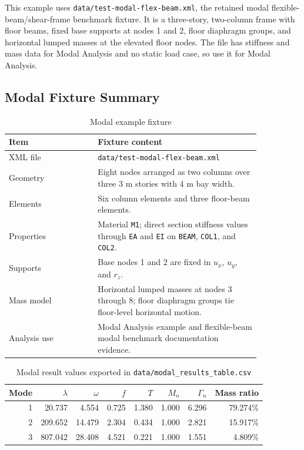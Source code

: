 \documentclass[11pt,a4paper]{article}
\begin{document}
This example uses \texttt{data/test-modal-flex-beam.xml}, the retained modal flexible-beam/shear-frame benchmark fixture. It is a three-story, two-column frame with floor beams, fixed base supports at nodes 1 and 2, floor diaphragm groups, and horizontal lumped masses at the elevated floor nodes. The file has stiffness and mass data for Modal Analysis and no static load case, so use it for Modal Analysis.

\subsection{Modal Fixture Summary}

\begin{table}[htbp]
\centering
\caption{Modal example fixture}
\begin{tabular}{p{0.30\linewidth}p{0.55\linewidth}}
\toprule
Item & Fixture content \\
\midrule
XML file & \texttt{data/test-modal-flex-beam.xml} \\
Geometry & Eight nodes arranged as two columns over three 3 m stories with 4 m bay width. \\
Elements & Six column elements and three floor-beam elements. \\
Properties & Material \texttt{M1}; direct section stiffness values through \texttt{EA} and \texttt{EI} on \texttt{BEAM}, \texttt{COL1}, and \texttt{COL2}. \\
Supports & Base nodes 1 and 2 are fixed in \(u_x\), \(u_y\), and \(r_z\). \\
Mass model & Horizontal lumped masses at nodes 3 through 8; floor diaphragm groups tie floor-level horizontal motion. \\
Analysis use & Modal Analysis example and flexible-beam modal benchmark documentation evidence. \\
\bottomrule
\end{tabular}
\end{table}

\begin{table}[htbp]
\centering
\caption{Modal result values exported in \texttt{data/modal\_results\_table.csv}}
\begin{tabular}{rrrrrrrr}
\toprule
Mode & \(\lambda\) & \(\omega\) & \(f\) & \(T\) & \(M_n\) & \(\Gamma_n\) & Mass ratio \\
\midrule
1 & 20.737 & 4.554 & 0.725 & 1.380 & 1.000 & 6.296 & 79.274\% \\
2 & 209.652 & 14.479 & 2.304 & 0.434 & 1.000 & 2.821 & 15.917\% \\
3 & 807.042 & 28.408 & 4.521 & 0.221 & 1.000 & 1.551 & 4.809\% \\
\bottomrule
\end{tabular}
\end{table}
\end{document}
